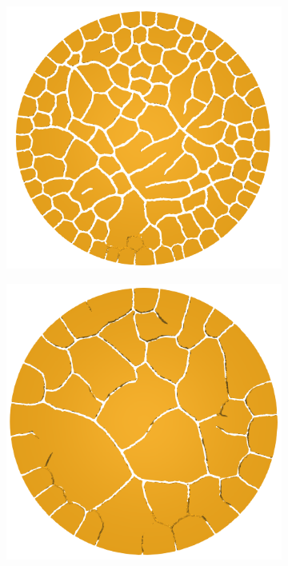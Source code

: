 \begin{figure}[!htb]
  \begin{subfigure}{0.23\textwidth}
    \includegraphics[width=\textwidth,scale=0.5]{Chapter4/figures/3D/4mm_top.png}
    \caption{}
  \end{subfigure}
  \hspace{0.05\textwidth}
  \begin{subfigure}{0.23\textwidth}
    \includegraphics[width=\textwidth,scale=0.5]{Chapter4/figures/3D/8mm_top.png}

\end{subfigure}
\end{figure}
